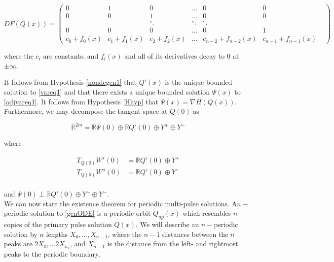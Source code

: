\documentclass[12pt]{article}
\def\R{{\mathbb R}}
\begin{document}
\begin{equation}
DF(Q(x)) = \begin{pmatrix}
0 & 1 & 0 & \dots & 0 & 0 \\
0 & 0 & 1 & \dots & 0 & 0 \\
& & \ddots & \ddots & \ddots & & \\
0 & 0 & 0 & \dots & 0 & 1 \\
c_0 + f_0(x) & c_1 + f_1(x) & c_2 + f_2(x) &
 \dots & c_{n-2} + f_{n-2}(x) & c_{n-1} + f_{n-1}(x)
\end{pmatrix}
\end{equation}

where the $c_i$ are constants, and $f_i(x)$ and all of its derivatives decay to 0 at $\pm \infty$.

It follows from Hypothesis \ref{nondegen1} that $Q'(x)$ is the unique bounded solution to \eqref{vareq1} and that there exists a unique bounded solution $\Psi(x)$ to \eqref{adjvareq1}. It follows from Hypothesis \ref{Hhyp} that $\Psi(x) = \nabla H(Q(x))$. \\

Furthermore, we may decompose the tangent space at $Q(0)$ as 

\begin{equation}
\R^{2m} = \R \Psi(0) \oplus \R Q'(0) \oplus Y^+ \oplus Y^-
\end{equation}

where

\begin{align*}
T_{Q(0)}W^s(0) &= \R Q'(0) \oplus Y^+ \\
T_{Q(0)}W^u(0) &= \R Q'(0) \oplus Y^- \\
\end{align*}

and $\Psi(0) \perp \R Q'(0) \oplus Y^+ \oplus Y^-$.\\

We can now state the existence theorem for periodic multi-pulse solutions. A$n-$periodic solution to \eqref{genODE} is a periodic orbit $Q_{np}(x)$ which resembles $n$ copies of the primary pulse solution $Q(x)$. We will describe an $n-$periodic solution by $n$ lengths $X_0, \dots, X_{n-1}$, where the $n-1$ distances between the $n$ peaks are $2X_0, \dots 2X_{n_2}$, and $X_{n-1}$ is the distance from the left- and rightmost peaks to the periodic boundary.
\end{document}
